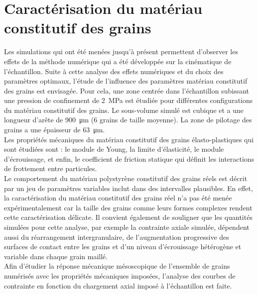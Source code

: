 \section{Caractérisation du matériau constitutif des grains} %
	Les simulations qui ont été menées jusqu'à présent permettent d'observer les effets de la méthode numérique qui a été développée sur la cinématique de l'échantillon. Suite à cette analyse des effets numériques et du choix des paramètres optimaux, l'étude de l'influence des paramètres matériau constitutif des grains est envisagée. Pour cela, une zone centrée dans l'échantillon subissant une pression de confinement de \SI{2}{\mega\pascal} est étudiée pour différentes configurations du matériau constitutif des grains. Le sous-volume simulé est cubique et a une longueur d'arête de \SI{900}{\micro\meter} (\num{6} grains de taille moyenne). La zone de pilotage des grains a une épaisseur de \SI{63}{\micro\meter}.
	\\Les propriétés mécaniques du matériau constitutif des grains élasto-plastiques qui sont étudiées sont : le module de Young, la limite d'élasticité, le module d'écrouissage, et enfin, le coefficient de friction statique qui définit les interactions de frottement entre particules.
	\\Le comportement du matériau polystyrène constitutif des grains réels est décrit par un jeu de	paramètres variables inclut dans des intervalles plausibles. En effet, la caractérisation du matériau constitutif des grains réel n’a pas été menée expérimentalement car la taille des grains comme leurs formes complexes rendent cette caractérisation délicate. Il convient également de souligner que les quantités simulées pour cette analyse, par exemple la contrainte axiale simulée, dépendent aussi du réarrangement intergranulaire, de l’augmentation progressive des surfaces de contact entre les grains et d’un niveau d’écrouissage hétérogène et variable dans chaque grain maillé.
	\\Afin d'étudier la réponse mécanique mésoscopique de l'ensemble de grains numérisés avec les propriétés mécaniques imposées, l'analyse des courbes de contrainte en fonction du chargement axial imposé à l'échantillon est faite.
